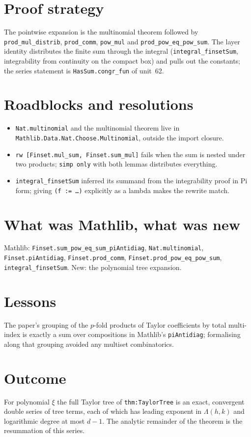 \documentclass[11pt]{article}
\begin{document}
\section{Proof strategy}
The pointwise expansion is the multinomial theorem followed by \texttt{prod\_mul\_distrib},
\texttt{prod\_comm}, \texttt{pow\_mul} and \texttt{prod\_pow\_eq\_pow\_sum}. The layer identity
distributes the finite sum through the integral (\texttt{integral\_finsetSum}, integrability from
continuity on the compact box) and pulls out the constants; the series statement is
\texttt{HasSum.congr\_fun} of unit~62.

\section{Roadblocks and resolutions}
\begin{itemize}
\item \texttt{Nat.multinomial} and the multinomial theorem live in
\texttt{Mathlib.Data.Nat.Choose.Multinomial}, outside the import closure.
\item \texttt{rw [Finset.mul\_sum, Finset.sum\_mul]} fails when the sum is nested under two products;
\texttt{simp only} with both lemmas distributes everything.
\item \texttt{integral\_finsetSum} inferred its summand from the integrability proof in Pi form; giving
\texttt{(f := …)} explicitly as a lambda makes the rewrite match.
\end{itemize}

\section{What was Mathlib, what was new}
Mathlib: \texttt{Finset.sum\_pow\_eq\_sum\_piAntidiag}, \texttt{Nat.multinomial},
\texttt{Finset.piAntidiag}, \texttt{Finset.prod\_comm}, \texttt{Finset.prod\_pow\_eq\_pow\_sum},
\texttt{integral\_finsetSum}. New: the polynomial tree expansion.

\section{Lessons}
The paper's grouping of the $p$-fold products of Taylor coefficients by total multi-index is exactly a
sum over compositions in Mathlib's \texttt{piAntidiag}; formalising along that grouping avoided any
multiset combinatorics.

\section{Outcome}
For polynomial $\xi$ the full Taylor tree of \texttt{thm:TaylorTree} is an exact, convergent double
series of tree terms, each of which has leading exponent in $\Lambda(h,k)$ and logarithmic degree at
most $d-1$. The analytic remainder of the theorem is the resummation of this series.
\end{document}
